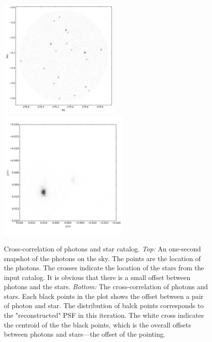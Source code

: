 \documentclass[12pt, preprint]{aastex}
\begin{document}
\begin{figure}[p]
\begin{center}
\includegraphics[width=0.535\textwidth]{figures/photons600}
\includegraphics[width=0.58\textwidth]{figures/co600}
\end{center}
\caption{%
  \label{slice}
  Cross-correlation of photons and star catalog.
  \emph{Top:}  An one-second snapshot of the photons on the sky. The points are the location of the photons. The crosses indicate the location of the stars from the input catalog. It is obvious that there is a small offset between photons and the stars.
  \emph{Bottom:} The cross-correlation of photons and stars. 
  Each black points in the plot shows the offset between a pair of photon and star.
  The distribution of balck points corresponds to the "reconstructed" PSF in this iteration. 
  The white cross indicates the centroid of the the black points, which is the overall offsets between photons and stars---the offset of the pointing.
  }
\end{figure}
\end{document}
